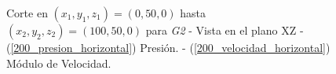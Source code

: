 \documentclass[10pt,a4paper,final]{article}
\begin{document}
%
%
\begin{figure}[tbhp]
   \centering
   \hspace{0.1\linewidth}
    \caption{Corte en $(x_1,y_1,z_1)=(0,50,0)$ hasta $(x_2,y_2,z_2)=(100,50,0)$ para \emph{G2} - Vista en el plano XZ - (\ref{200_presion_horizontal}) Presión. - (\ref{200_velocidad_horizontal}) Módulo de Velocidad.}
   \label{200_velocidad_presion_horizontal}                %
\end{figure}
%
%
\end{document}
